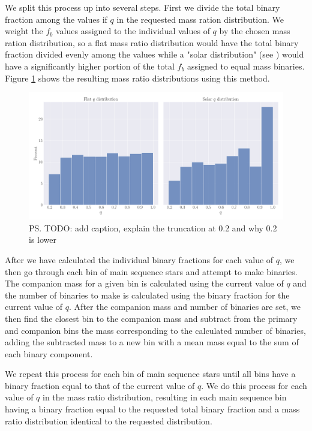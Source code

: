 We split this process up into several steps. First we divide the total binary fraction
among the values if $q$ in the requested mass ration distribution. We weight the $f_b$ values
assigned to the individual values of $q$ by the chosen mass ration distribution, so a flat mass
ratio distribution would have the total binary fraction divided evenly among the values while a
"solar distribution" (see \citealt{Fisher2005}) would have a significantly higher portion of the
total $f_b$ assigned to equal mass binaries. Figure \ref{fig:2/q-dists} shows the resulting mass ratio distributions using this method.

\begin{figure}
	\centering
	\includegraphics[width=\textwidth]{figures/q-dists.png}
\caption{\ps{TODO: add caption, explain the truncation at 0.2 and why 0.2 is lower}}
	\label{fig:2/q-dists}
\end{figure}


After we have calculated the individual binary fractions for each value of $q$, we then go through
each bin of main sequence stars and attempt to make binaries. The companion mass for a given bin is
calculated using the current value of $q$ and the number of binaries to make is calculated using the
binary fraction for the current value of $q$. After the companion mass and number of binaries are
set, we then find the closest bin to the companion mass and subtract from the primary and companion
bins the mass corresponding to the calculated number of binaries, adding the subtracted mass to a
new bin with a mean mass equal to the sum of each binary component.


We repeat this process for each bin of main sequence stars until all bins have a binary fraction
equal to that of the current value of $q$. We do this process for each value of $q$ in the mass
ratio distribution, resulting in each main sequence bin having a binary fraction equal to the
requested total binary fraction and a mass ratio distribution identical to the requested
distribution.


